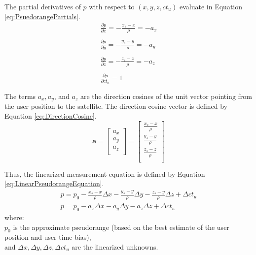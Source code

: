 \documentclass[11pt,letterpaper]{article}
\begin{document}
The partial derivatives of $p$ with respect to $(x,y,z,ct_u)$ evaluate in Equation \ref{eq:PsuedorangePartials}.
\begin{equation} \label{eq:PsuedorangePartials}
\begin{array}{l}
\frac{\partial p}{\partial x} = -\frac{x_s - x}{\rho} = -a_x\\ \\
\frac{\partial p}{\partial y} = -\frac{y_s - y}{\rho} = -a_y \\ \\
\frac{\partial p}{\partial z} = -\frac{z_s - z}{\rho} = -a_z \\ \\
\frac{\partial p}{\partial ct_u} = 1 \\ \\
\end{array}
\end{equation}
The terms $a_x, a_y$, and $a_z$ are the direction cosines of the unit vector pointing from the user position to the satellite. The direction cosine vector is defined by Equation
\ref{eq:DirectionCosine}.
\begin{equation} \label{eq:DirectionCosine}
\mathbf{a} = \left[
\begin{array}{c}
a_x \\
a_y \\
a_z \\
\end{array}
\right] = \left[
\begin{array}{c}
\frac{x_s-x}{\rho} \\
\frac{y_s-y}{\rho} \\
\frac{z_s-z}{\rho} \\
\end{array}
\right]
\end{equation}

Thus, the linearized measurement equation is defined by Equation \ref{eq:LinearPseudorangeEquation}.
\begin{equation} \label{eq:LinearPseudorangeEquation}
\begin{array}{l}
p = p_0 - \frac{x_s - x}{\rho} \Delta x - \frac{y_s-y}{\rho} \Delta y - \frac{z_s-y}{\rho} \Delta z + \Delta ct_u \\
p = p_0 - a_x \Delta x - a_y \Delta y - a_z \Delta z + \Delta ct_u
\end{array}
\end{equation}
where: \\
$p_0$ is the approximate pseudorange (based on the best estimate of the user position and user time bias), \\
and $\Delta x, \Delta y, \Delta z, \Delta ct_u$ are the linearized unknowns. \\
\end{document}
